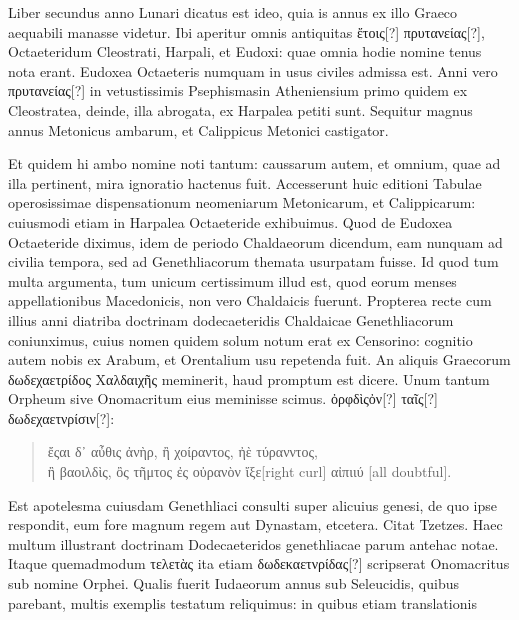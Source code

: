 Liber secundus anno Lunari dicatus est ideo, quia is annus ex illo
Graeco aequabili manasse videtur.
Ibi aperitur omnis antiquitas \textgreek{ἔτοις[?]
πρυτανείας[?]}, Octaeteridum Cleostrati, Harpali, et Eudoxi: quae omnia
hodie nomine tenus nota erant.
Eudoxea Octaeteris numquam
in usus civiles admissa est.
Anni vero \textgreek{πρυτανείας[?]} in vetustissimis Psephismasin
Atheniensium primo quidem ex Cleostratea, deinde, illa
abrogata, ex Harpalea petiti sunt.
Sequitur magnus annus Metonicus
ambarum, et Calippicus Metonici castigator.

Et quidem hi
ambo nomine noti tantum: caussarum autem, et omnium, quae ad
illa pertinent, mira ignoratio hactenus fuit.
Accesserunt huic editioni
Tabulae operosissimae dispensationum neomeniarum Metonicarum,
et Calippicarum: cuiusmodi etiam in Harpalea Octaeteride
exhibuimus. 
Quod de Eudoxea Octaeteride diximus, idem de
periodo Chaldaeorum dicendum, eam nunquam ad civilia tempora,
sed ad Genethliacorum themata usurpatam fuisse.
Id quod tum
multa argumenta, tum unicum certissimum illud est, quod eorum
menses appellationibus Macedonicis, non vero Chaldaicis fuerunt.
Propterea recte cum illius anni diatriba doctrinam dodecaeteridis
Chaldaicae Genethliacorum coniunximus, cuius nomen quidem
solum notum erat ex Censorino: cognitio autem nobis ex Arabum,
et Orentalium usu repetenda fuit.
An aliquis Graecorum \textgreek{δωδεχαετρίδος Χαλδαιχῆς}
meminerit, haud promptum est dicere.
Unum tantum Orpheum sive Onomacritum eius meminisse scimus. 
\textgreek{ὀρφδὶςὀν[?] ταῖς[?] δωδεχαετνρίσιν[?]:}
\begin{quote}
\begin{greek}
ἔςαι δ᾽ αὖθις ἀνὴρ, ἢ χοίραντος, ἠὲ τύρανντος,\\
ἢ βαοιλδὶς, ὂς τῆμτος ἐς οὐρανὸν ἴξε[right curl] αἰπιιύ
 [all doubtful].
\end{greek}
\end{quote}
Est apotelesma cuiusdam Genethliaci consulti super alicuius genesi,
de quo ipse respondit, eum fore magnum regem aut Dynastam, etcetera.
Citat Tzetzes. 
Haec multum illustrant doctrinam Dodecaeteridos
genethliacae parum antehac notae.
Itaque quemadmodum \textgreek{τελετὰς}
ita etiam \textgreek{δωδεκαετνρίδας[?]} scripserat Onomacritus sub nomine
Orphei.
Qualis fuerit Iudaeorum annus sub Seleucidis, quibus parebant,
multis exemplis testatum reliquimus: in quibus etiam translationis

